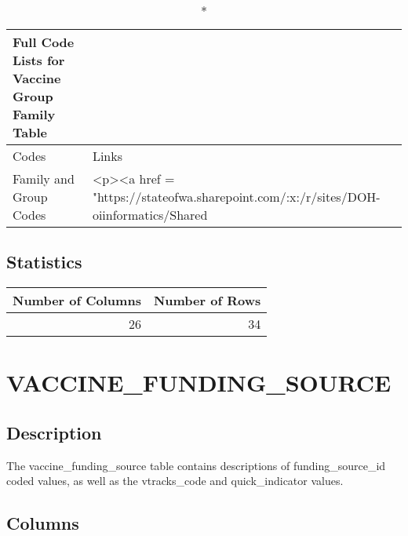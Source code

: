 \documentclass[
  letterpaper,
  DIV=11,
  numbers=noendperiod]{scrreprt}
\begin{document}
\begin{longtable}{ll}
\caption*{
{\large Full Code Lists for Vaccine Group Family Table}
} \\ 
\toprule
Codes & Links \\ 
\midrule
Family and Group Codes & <p><a href = "https://stateofwa.sharepoint.com/:x:/r/sites/DOH-oiinformatics/Shared%
\bottomrule
\end{longtable}

\hypertarget{statistics-47}{%
\section*{Statistics}\label{statistics-47}}

\begin{longtable}{rr}
\toprule
Number of Columns & Number of Rows \\ 
\midrule
26 & 34 \\ 
\bottomrule
\end{longtable}

\hypertarget{vaccine_funding_source}{%
\chapter*{VACCINE\_FUNDING\_SOURCE}\label{vaccine_funding_source}}

\hypertarget{description-48}{%
\section*{Description}\label{description-48}}

The vaccine\_funding\_source table contains descriptions of
funding\_source\_id coded values, as well as the vtracks\_code and
quick\_indicator values.

\hypertarget{columns-48}{%
\section*{Columns}\label{columns-48}}
\end{document}
